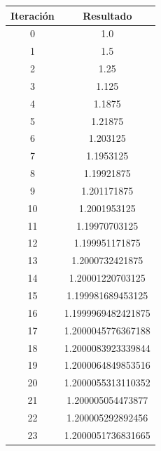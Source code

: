 \documentclass[titlepage,a4paper]{article}
\begin{document}
\begin{multicols}{2}
\begin{center}
    \begin{tabular}{| c | c |}
    \hline
     Iteración & Resultado \\ \hline
      0     &  1.0 \\
1     &  1.5 \\
2     &  1.25 \\
3     &  1.125 \\
4     &  1.1875 \\
5     &  1.21875 \\
6     &  1.203125 \\
7     &  1.1953125 \\
8     &  1.19921875 \\
9     &  1.201171875 \\
10     &  1.2001953125 \\
11     &  1.19970703125 \\
12     &  1.199951171875 \\
13     &  1.2000732421875 \\
14     &  1.20001220703125 \\
15     &  1.199981689453125 \\
16     &  1.1999969482421875 \\
17     &  1.2000045776367188 \\
18     &  1.2000083923339844 \\
19     &  1.2000064849853516 \\
20     &  1.2000055313110352 \\
21     &  1.200005054473877 \\
22     &  1.200005292892456 \\
23     &  1.2000051736831665 \\


\end{tabular}
\end{center}
\end{multicols}
\end{document}
